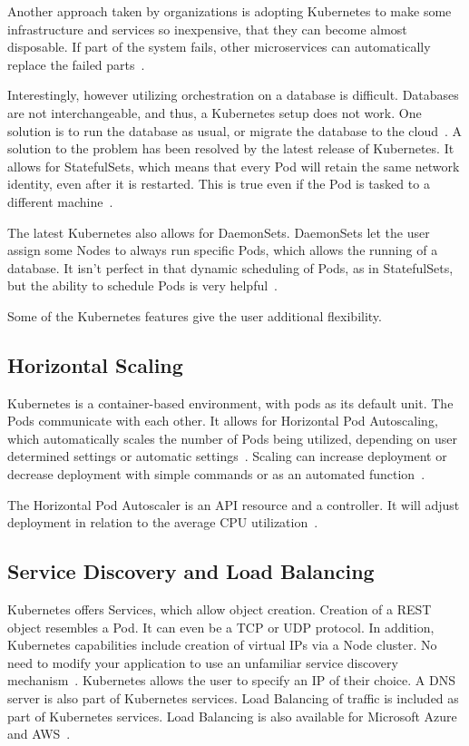 Another approach taken by organizations is adopting Kubernetes to make
some infrastructure and services so inexpensive, that they can become
almost disposable.  If part of the system fails, other microservices
can automatically replace the failed parts~\cite{reasons}.  

Interestingly, however utilizing orchestration on a database is
difficult.  Databases are not interchangeable, and thus, a Kubernetes
setup does not work.  One solution is to run the database as usual, or
migrate the database to the cloud~\cite{reasons}.  A solution to the
problem has been resolved by the latest release of Kubernetes.  It
allows for StatefulSets, which means that every Pod will retain the
same network identity, even after it is restarted.  This is true even
if the Pod is tasked to a different machine~\cite{reasons}.  

The latest Kubernetes also allows for DaemonSets.  DaemonSets let the
user assign some Nodes to always run specific Pods, which allows the
running of a database.  It isn't perfect in that dynamic scheduling of
Pods, as in StatefulSets, but the ability to schedule Pods is very
helpful~\cite{reasons}.

Some of the Kubernetes features give the user additional flexibility.  

\subsection{Horizontal Scaling}

Kubernetes is a container-based environment, with pods as its default 
unit. The Pods communicate with each other.  It allows for Horizontal
Pod Autoscaling, which automatically scales the number of Pods being
utilized, depending on user determined settings or automatic
settings~\cite{concept}. Scaling can increase deployment or decrease
deployment with simple commands or as an automated
function~\cite{concept}.

The Horizontal Pod Autoscaler is an API resource and a controller.  It
will adjust deployment in relation to the average CPU
utilization~\cite{concept}.  

\subsection{Service Discovery and Load Balancing}

Kubernetes offers Services, which allow object creation.  Creation of
a REST object resembles a Pod.  It can even be a TCP or UDP protocol.
In addition, Kubernetes capabilities include creation of virtual IPs
via a Node cluster.  No need to modify your application to use an
unfamiliar service discovery mechanism~\cite{concept}. Kubernetes
allows the user to specify an IP of their choice.  A DNS server is
also part of Kubernetes services.  Load Balancing of traffic is
included as part of Kubernetes services.  Load Balancing is also
available for Microsoft Azure and AWS~\cite{concept}.

